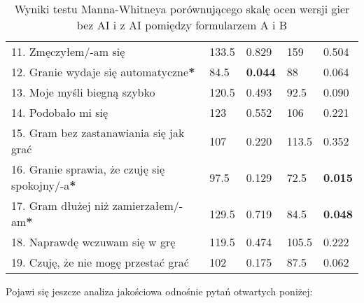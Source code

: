 \begin{table}[h!]
\begin{center}
\begin{tabular}{|m{10em}|m{5em}|m{5em}|m{5em}|m{5em}|}
            11. Zmęczyłem/-am się                                             & 133.5                       & 0.829            & 159                     & 0.504          \\
            12. Granie wydaje się automatyczne\textbf{*}                      & 84.5                        & \textbf{0.044}   & 88                      & 0.064          \\
            13. Moje myśli \newline biegną szybko                             & 120.5                       & 0.493            & 92.5                    & 0.090          \\
            14. Podobało mi się                                               & 123                         & 0.552            & 106                     & 0.221          \\
            15. Gram bez zastanawiania się jak grać                           & 107                         & 0.220            & 113.5                   & 0.352          \\
            16. Granie sprawia, \newline że czuję się spokojny/-a\textbf{*}   & 97.5                        & 0.129            & 72.5                    & \textbf{0.015} \\
            17. Gram dłużej \newline niż zamierzałem/-am\textbf{*}            & 129.5                       & 0.719            & 84.5                    & \textbf{0.048} \\
            18. Naprawdę wczuwam się w grę                                    & 119.5                       & 0.474            & 105.5                   & 0.222          \\
            19. Czuję, że nie mogę przestać grać                              & 102                         & 0.175            & 87.5                    & 0.062          \\
            \hline
        \end{tabular}
    \end{center}
    \caption{Wyniki testu Manna-Whitneya porównującego skalę ocen wersji gier bez AI i z AI pomiędzy formularzem A i B}\label{tab1:ch7_14}
\end{table}

Pojawi się jeszcze analiza jakościowa odnośnie pytań otwartych poniżej: